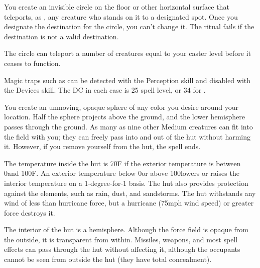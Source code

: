 \begin{spelleffect}
You create an invisible circle on the floor or other horizontal surface that teleports, as , any creature who stands on it to a designated spot. Once you designate the destination for the circle, you can't change it. The ritual fails if the destination is not a valid destination.
\par The circle can teleport a number of creatures equal to your caster level before it ceases to function.
\end{spelleffect}
\begin{spellnotes}
Magic traps such as  can be detected with the Perception skill and disabled with the Devices skill. The DC in each case is 25 \add spell level, or 34 for .
\end{spellnotes}

\begin{spelleffect}
You create an unmoving, opaque sphere of any color you desire around your location. Half the sphere projects above the ground, and the lower hemisphere passes through the ground. As many as nine other Medium creatures can fit into the field with you; they can freely pass into and out of the hut without harming it. However, if you remove yourself from the hut, the spell ends.
\par The temperature inside the hut is 70\degree F if the exterior temperature is between 0\degree and 100\degree F. An exterior temperature below 0\degree or above 100\degree lowers or raises the interior temperature on a 1-degree-for-1 basis. The hut also provides protection against the elements, such as rain, dust, and sandstorms. The hut withstands any wind of less than hurricane force, but a hurricane (75\add mph wind speed) or greater force destroys it.
\par The interior of the hut is a hemisphere. Although the force field is opaque from the outside, it is transparent from within. Missiles, weapons, and most spell effects can pass through the hut without affecting it, although the occupants cannot be seen from outside the hut (they have total concealment).
\end{spelleffect}

